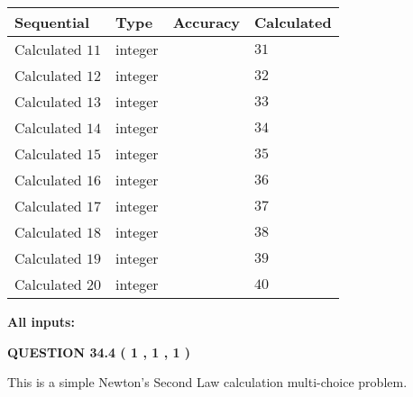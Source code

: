 \documentclass[12pt]{article}
\begin{document}
   
  
  
\noindent\begin{tabular}{|l|l|l|l|}
\hline
 Sequential & Type & Accuracy & Calculated \\ 
\hline
 
 
  Calculated $           11 $ & integer &  & 
  $ 31 $ 
 \\  \hline  
 
 
  Calculated $           12 $ & integer &  & 
  $ 32 $ 
 \\  \hline  
 
 
  Calculated $           13 $ & integer &  & 
  $ 33 $ 
 \\  \hline  
 
 
  Calculated $           14 $ & integer &  & 
  $ 34 $ 
 \\  \hline  
 
 
  Calculated $           15 $ & integer &  & 
  $ 35 $ 
 \\  \hline  
 
 
  Calculated $           16 $ & integer &  & 
  $ 36 $ 
 \\  \hline  
 
 
  Calculated $           17 $ & integer &  & 
  $ 37 $ 
 \\  \hline  
 
 
  Calculated $           18 $ & integer &  & 
  $ 38 $ 
 \\  \hline  
 
 
  Calculated $           19 $ & integer &  & 
  $ 39 $ 
 \\  \hline  
 
 
  Calculated $           20 $ & integer &  & 
  $ 40 $ 
 \\  \hline  
 \end{tabular}
   
   
   
   
\noindent\vspace{0.1in}\hspace{-0.08in} {\textbf{\Large{All inputs: }}}
   
   
  
\vspace{0.2in}
  
{\textbf{\Large{QUESTION
34.4 
 (           1 ,           1 ,           1 )
}}}
  
  


\noindent{}
This is a simple Newton's Second Law calculation multi-choice problem.  
\noindent{}
\end{document}
